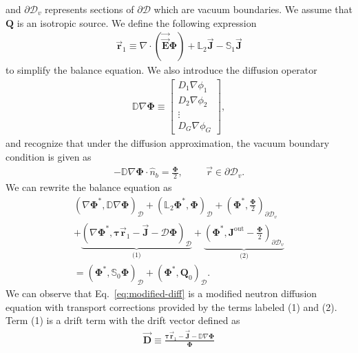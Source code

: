 %
and $\partial\mathcal{D}_v$ represents sections of $\partial\mathcal{D}$ which are vacuum
boundaries. We assume that $\bm{Q}$ is an isotropic source. We define the following expression
%
\begin{gather}
  \vec{\bm{r}}_1 \equiv \nabla\cdot(\vec{\vec{\bm{E}}}\bm{\Phi}) + \mathbb{L}_2\vec{\bm{J}} -
  \mathbb{S}_1\vec{\bm{J}} \label{eq:1st-moment}
\end{gather}
%
to simplify the balance equation. We also introduce the diffusion operator
%
\begin{gather}
  \mathbb{D}\nabla\bm{\Phi} \equiv
  \begin{bmatrix}
    D_1\nabla\phi_1 \\
    D_2\nabla\phi_2 \\
    \vdots \\
    D_G\nabla\phi_G
  \end{bmatrix},
\end{gather}
%
and recognize that under the diffusion approximation, the vacuum boundary condition is given as
%
\begin{gather}
  -\mathbb{D}\nabla\bm{\Phi}\cdot\hat{n}_b = \frac{\bm{\Phi}}{2}, \hspace{1cm} \vec{r}\in\partial
  \mathcal{D}_v.
\end{gather}
%
We can rewrite the balance equation as
%
\begin{multline}
  \left(\nabla\bm{\Phi}^*, \mathbb{D}\nabla\bm{\Phi}\right)_\mathcal{D}
  + \left(\mathbb{L}_2\bm{\Phi}^*,\bm{\Phi}\right)_\mathcal{D}
  + \left(\bm{\Phi}^*,\frac{\bm{\Phi}}{2}\right)_{\partial\mathcal{D}_v} \\
  + \underbrace{\left(\nabla\bm{\Phi}^*,\bm{\tau}\vec{\bm{r}}_1-\vec{\bm{J}}-\mathcal{D}\bm{\Phi}\right)_\mathcal{D}}_\text{(1)}
  + \underbrace{\left(\bm{\Phi}^*,\bm{J}^\text{out}-\frac{\bm{\Phi}}{2}\right)_{\partial\mathcal{D}_v}}_\text{(2)} \\
  = \left(\bm{\Phi}^*,\mathbb{S}_0\bm{\Phi}\right)_\mathcal{D}
  + \left(\bm{\Phi}^*,\bm{Q}_0\right)_\mathcal{D}. \label{eq:modified-diff}
\end{multline}
%
We can observe that Eq.\ \ref{eq:modified-diff} is a modified neutron diffusion equation with
transport corrections provided by the terms labeled (1) and (2). Term (1) is a drift term with
the drift vector defined as
%
\begin{gather}
  \vec{\bm{D}} \equiv \frac{\bm{\tau}\vec{\bm{r}}_1-\vec{\bm{J}}-\mathbb{D}\nabla\bm{\Phi}}{\bm{\Phi}}
\end{gather}
